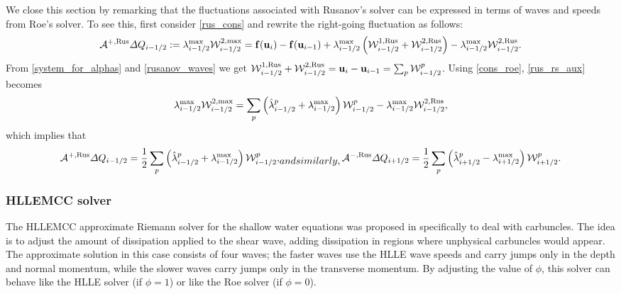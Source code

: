 \documentclass[preprint, 11pt]{article}
\newcommand{\W}{{\mathcal W}}
\newcommand{\A}{{\mathcal A}}
\newcommand{\bff}{{\bf f}}
\newcommand{\bfu}{{\bf u}}
\newcommand{\Rus}{{\rm Rus}}
\begin{document}
We close this section by remarking that the fluctuations associated with Rusanov's solver
can be expressed in terms of waves and speeds from Roe's solver. To see this, first consider \eqref{rus_cons}
and rewrite the right-going fluctuation as follows:
\begin{align}\label{rus_rs_aux}
  \A^{+,\Rus}\Delta Q_{i-1/2}:=\lambda_{i-1/2}^{\max}\W_{i-1/2}^{2,\max}
  = \bff(\bfu_{i})-\bff(\bfu_{i-1}) + \lambda_{i-1/2}^{\max}\left(\W_{i-1/2}^{1,\Rus}+\W_{i-1/2}^{2,\Rus}\right)
  -\lambda_{i-1/2}^{\max}\W_{i-1/2}^{2,\Rus}.
\end{align}
From \eqref{system_for_alphas} and \eqref{rusanov_waves} we get
$\W^{1,\Rus}_{i-1/2}+\W^{2,\Rus}_{i-1/2}=\bfu_i-\bfu_{i-1}=\sum_p\W_{i-1/2}^p$.
Using \eqref{cons_roe}, \eqref{rus_rs_aux} becomes
\begin{align*}
  \lambda_{i-1/2}^{\max}\W_{i-1/2}^{2,\max}
  = \sum_p \left(\hat \lambda_{i-1/2}^p + \lambda_{i-1/2}^{\max}\right)\W_{i-1/2}^p
  -\lambda_{i-1/2}^{\max}\W_{i-1/2}^{2,\Rus},
\end{align*}
which implies that
\begin{subequations}\label{fluct_rus}
\begin{align}
  \A^{+,\Rus}\Delta Q_{i-1/2}=\frac{1}{2}\sum_p\left(\hat \lambda_{i-1/2}^p + \lambda_{i-1/2}^{\max}\right)\W_{i-1/2}^p,
\end{align}
and similarly,
\begin{align}
  \A^{-,\Rus}\Delta Q_{i+1/2}=\frac{1}{2}\sum_p\left(\hat \lambda_{i+1/2}^p - \lambda_{i+1/2}^{\max}\right)\W_{i+1/2}^p.
\end{align}
\end{subequations}

\subsubsection{HLLEMCC solver}
The HLLEMCC approximate Riemann solver for the shallow water equations was proposed
in \cite{kemm2014note} specifically to deal with carbuncles.  The idea is to adjust
the amount of dissipation applied to the shear wave, adding dissipation in regions
where unphysical carbuncles would appear.  The approximate solution in this
case consists of four waves; the faster waves use the HLLE wave speeds and carry
jumps only in the depth and normal momentum, while the slower waves carry jumps
only in the transverse momentum.  By adjusting the value of $\phi$, this solver
can behave like the HLLE solver (if $\phi=1$) or like the Roe solver (if $\phi=0$).
\end{document}
